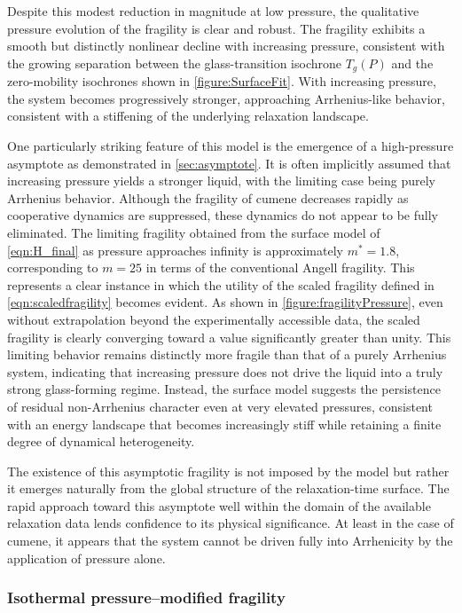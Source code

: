 Despite this modest reduction in magnitude at low pressure, the qualitative pressure evolution of the fragility is clear and robust. The fragility exhibits a smooth but distinctly nonlinear decline with increasing pressure, consistent with the growing separation between the glass-transition isochrone $T_g(P)$ and the zero-mobility isochrones shown in \fig  \ref{figure:SurfaceFit}. With increasing pressure, the system becomes progressively stronger, approaching Arrhenius-like behavior, consistent with a stiffening of the underlying relaxation landscape.

One particularly striking feature of this model is the emergence of a high-pressure asymptote as demonstrated in \sect \ref{sec:asymptote}. It is often implicitly assumed that increasing pressure yields a stronger liquid, with the limiting case being purely Arrhenius behavior. Although the fragility of cumene decreases rapidly as cooperative dynamics are suppressed, these dynamics do not appear to be fully eliminated. The limiting fragility obtained from the surface model of \eqn \ref{eqn:H_final} as pressure approaches infinity is approximately $m^* = 1.8$, corresponding to $m = 25$ in terms of the conventional Angell fragility. This represents a clear instance in which the utility of the scaled fragility defined in \eqn \ref{eqn:scaledfragility} becomes evident. As shown in \fig  \ref{figure:fragilityPressure}, even without extrapolation beyond the experimentally accessible data, the scaled fragility is clearly converging toward a value significantly greater than unity. This limiting behavior remains distinctly more fragile than that of a purely Arrhenius system, indicating that increasing pressure does not drive the liquid into a truly strong glass-forming regime. Instead, the surface model suggests the persistence of residual non-Arrhenius character even at very elevated pressures, consistent with an energy landscape that becomes increasingly stiff while retaining a finite degree of dynamical heterogeneity.

The existence of this asymptotic fragility is not imposed by the model but rather it emerges naturally from the global structure of the relaxation-time surface. The rapid approach toward this asymptote well within the domain of the available relaxation data lends confidence to its physical significance. At least in the case of cumene, it appears that the system cannot be driven fully into Arrhenicity by the application of pressure alone.


\subsubsection*{Isothermal pressure–modified fragility}

